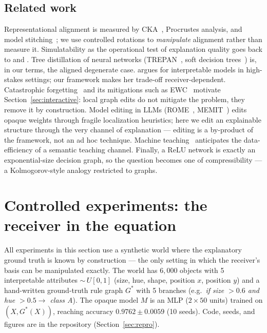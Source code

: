 \documentclass[10pt]{article}
\theoremstyle{definition}
\theoremstyle{plain}
\begin{document}
\subsection{Related work}
\label{sec:related}

Representational alignment is measured by CKA~\citep{kornblith2019similarity}, Procrustes analysis, and model stitching~\citep{lenc2015understanding}; we use controlled rotations to \emph{manipulate} alignment rather than measure it. Simulatability as the operational test of explanation quality goes back to \citet{doshivelez2017towards} and \citet{hase2020evaluating}. Tree distillation of neural networks (TREPAN~\citep{craven1996extracting}, soft decision trees~\citep{frosst2017distilling}) is, in our terms, the aligned degenerate case. \citet{rudin2019stop} argues for interpretable models in high-stakes settings; our framework makes her trade-off receiver-dependent. Catastrophic forgetting~\citep{mccloskey1989catastrophic,french1999catastrophic} and its mitigations such as EWC~\citep{kirkpatrick2017overcoming} motivate Section~\ref{sec:interactive}: local graph edits do not mitigate the problem, they remove it by construction. Model editing in LLMs (ROME~\citep{meng2022locating}, MEMIT~\citep{meng2023massediting}) edits opaque weights through fragile localization heuristics; here we edit an explainable structure through the very channel of explanation --- editing is a by-product of the framework, not an ad hoc technique. Machine teaching~\citep{zhu2015machine} anticipates the data-efficiency of a semantic teaching channel. Finally, a ReLU network is exactly an exponential-size decision graph, so the question becomes one of compressibility --- a Kolmogorov-style analogy restricted to graphs.

\section{Controlled experiments: the receiver in the equation}
\label{sec:synthetic}

All experiments in this section use a synthetic world where the explanatory ground truth is known by construction --- the only setting in which the receiver's basis can be manipulated exactly. The world has $6{,}000$ objects with 5 interpretable attributes ${\sim}\,U[0,1]$ (size, hue, shape, position $x$, position $y$) and a hand-written ground-truth rule graph $G^\ast$ with 5 branches (e.g.\ \emph{if size $> 0.6$ and hue $> 0.5 \to$ class A}). The opaque model $M$ is an MLP ($2 \times 50$ units) trained on $(X, G^\ast(X))$, reaching accuracy $0.9762 \pm 0.0059$ (10 seeds). Code, seeds, and figures are in the repository (Section~\ref{sec:repro}).
\end{document}

